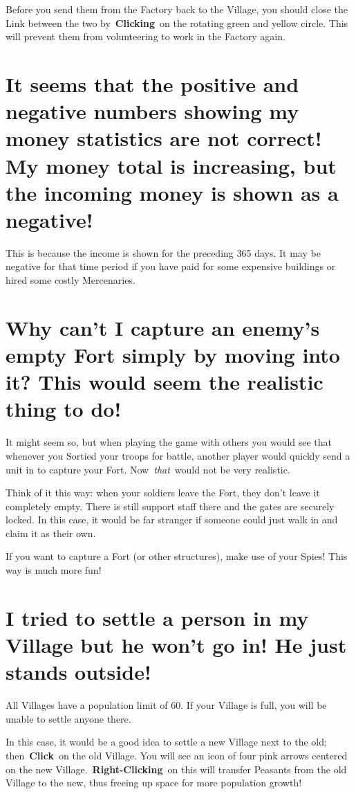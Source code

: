Before you send them from the Factory back to the Village, you should close the Link between the two by \textbf{Clicking} on the rotating green and yellow circle. This will prevent them from volunteering to work in the Factory again.

\section{It seems that the positive and negative numbers showing my money statistics are not correct! My money total is increasing, but the incoming money is shown as a negative!}

This is because the income is shown for the preceding 365 days. It may be negative for that time period if you have paid for some expensive buildings or hired some costly Mercenaries.

\section{Why can’t I capture an enemy’s empty Fort simply by moving into it? This would seem the realistic thing to do!}

It might seem so, but when playing the game with others you would see that whenever you Sortied your troops for battle, another player would quickly send a unit in to capture your Fort. Now \textit{that} would not be very realistic.

Think of it this way: when your soldiers leave the Fort, they don’t leave it completely empty. There is still support staff there and the gates are securely locked. In this case, it would be far stranger if someone could just walk in and claim it as their own.

If you want to capture a Fort (or other structures), make use of your Spies! This way is much more fun!

\section{I tried to settle a person in my Village but he won’t go in! He just stands outside!}

All Villages have a population limit of 60. If your Village is full, you will be unable to settle anyone there.

In this case, it would be a good idea to settle a new Village next to the old; then \textbf{Click} on the old Village. You will see an icon of four pink arrows centered on the new Village. \textbf{Right-Clicking} on this will transfer Peasants from the old Village to the new, thus freeing up space for more population growth!

